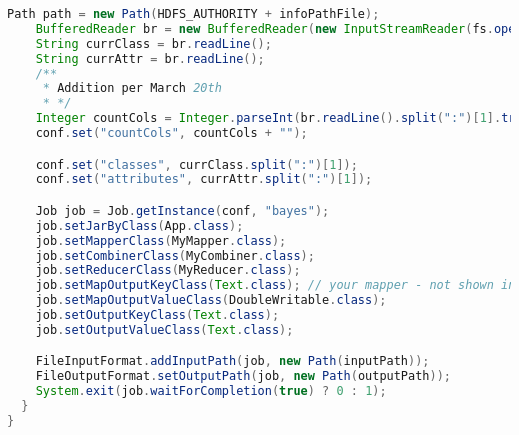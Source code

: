 \begin{lstlisting}[language=Java,basicstyle=\tiny,caption=App.java]
    Path path = new Path(HDFS_AUTHORITY + infoPathFile);
    BufferedReader br = new BufferedReader(new InputStreamReader(fs.open(path)));
    String currClass = br.readLine();
    String currAttr = br.readLine();
    /**
     * Addition per March 20th
     * */
    Integer countCols = Integer.parseInt(br.readLine().split(":")[1].trim());
    conf.set("countCols", countCols + "");

    conf.set("classes", currClass.split(":")[1]);
    conf.set("attributes", currAttr.split(":")[1]);

    Job job = Job.getInstance(conf, "bayes");
    job.setJarByClass(App.class);
    job.setMapperClass(MyMapper.class);
    job.setCombinerClass(MyCombiner.class);
    job.setReducerClass(MyReducer.class);
    job.setMapOutputKeyClass(Text.class); // your mapper - not shown in this example
    job.setMapOutputValueClass(DoubleWritable.class);
    job.setOutputKeyClass(Text.class);
    job.setOutputValueClass(Text.class);

    FileInputFormat.addInputPath(job, new Path(inputPath));
    FileOutputFormat.setOutputPath(job, new Path(outputPath));
    System.exit(job.waitForCompletion(true) ? 0 : 1);
  }
}
\end{lstlisting}


